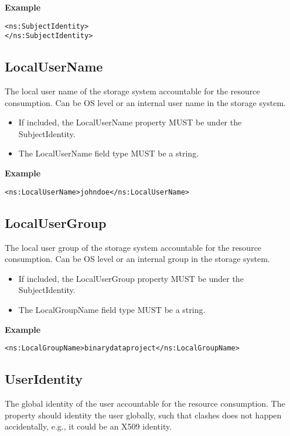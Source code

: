 {\bf Example}
\begin{verbatim}
<ns:SubjectIdentity>
</ns:SubjectIdentity>
\end{verbatim}


\subsection{LocalUserName}

The local user name of the storage system accountable for the resource
consumption. Can be OS level or an internal user name in the storage system.

\begin{itemize}
\item If included, the LocalUserName property MUST be under the
SubjectIdentity.
\item The LocalUserName field type MUST be a string.
\end{itemize}

{\bf Example}
\begin{verbatim}
<ns:LocalUserName>johndoe</ns:LocalUserName>
\end{verbatim}


\subsection{LocalUserGroup}

The local user group of the storage system accountable for the resource
consumption. Can be OS level or an internal group in the storage system.

\begin{itemize}
\item If included, the LocalUserGroup property MUST be under the
SubjectIdentity.
\item The LocalGroupName field type MUST be a string.
\end{itemize}

{\bf Example}
\begin{verbatim}
<ns:LocalGroupName>binarydataproject</ns:LocalGroupName>
\end{verbatim}


\subsection{UserIdentity}

The global identity of the user accountable for the resource consumption. The
property should identity the user globally, such that clashes does not happen
accidentally, e.g., it could be an X509 identity.


